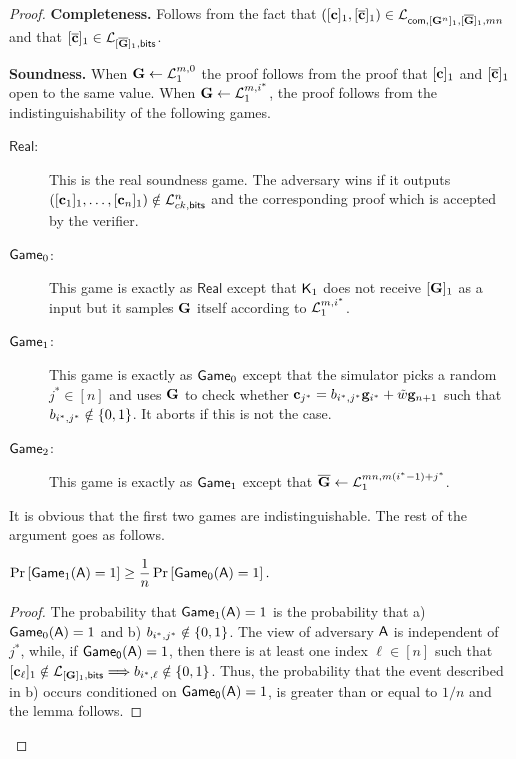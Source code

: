 \begin{proof}
{\bf Completeness.}
Follows from the fact that $([\mathbf{c}]_1,[\overline{\mathbf{c}}]_1)\in\mathcal{L}_{\mathsf{com},[\mathbf{{G}}^n]_1,[\overline{\mathbf{{G}}}]_1,mn}$ and that $[\overline{\mathbf{c}}]_1\in\mathcal{L}_{[\overline{\mathbf{{G}}}]_1,\mathsf{bits}}$.

{\bf Soundness.}
When $\mathbf{{G}}\gets\mathcal{L}_1^{m,0}$ the proof follows from the proof that $[\mathbf{c}]_1$ and $[{\overline{\mathbf{c}}}]_1$ open to the same value.
When $\mathbf{{G}}\gets\mathcal{L}_1^{m,i^*}$, the proof follows from the indistinguishability of the following games.

\begin{description}
\item[$\mathsf{Real}$:] This is the real soundness game. The adversary wins if it outputs $([\mathbf{c}_1]_1,\ldots,[\mathbf{c}_n]_1)\notin\mathcal{L}_{ck,\mathsf{bits}}^n$ and the corresponding proof which is accepted by the verifier.
\item[$\mathsf{Game}_0$:] This game is exactly as $\mathsf{Real}$ except that $\mathsf{K}_1$ does not receive $[\mathbf{{G}}]_1$ as a input but it samples $\mathbf{{G}}$ itself according to $\mathcal{L}_1^{m,i^*}$.
\item[$\mathsf{Game}_1$:] This game is exactly as $\mathsf{Game}_0$ except that the simulator picks a random $j^*\in[n]$ and uses $\mathbf{{G}}$ to check whether $\mathbf{c}_{j^*}=b_{i^*,j^*}\mathbf{g}_{i^*}+\tilde{w}\mathbf{g}_{n+1}$ such that $b_{i^*,j^*}\notin\{0,1\}$. It aborts if this is not the case.
\item[$\mathsf{Game}_2$:] This game is exactly as $\mathsf{Game}_1$ except that $\overline{\mathbf{{G}}}\gets\mathcal{L}_1^{mn, m(i^*-1)+j^*}$.
\end{description}

It is obvious that the first two games are indistinguishable. 
The rest of the argument goes as follows. 

\begin{lemma} $\Pr\left[ \mathsf{Game}_1(\mathsf{A})=1\right]\geq\dfrac{1}{n}\Pr\left[\mathsf{Game}_0(\mathsf{A})=1\right].$
\end{lemma}

\begin{proof}  The probability that
 $\mathsf{Game}_1(\mathsf{A})=1$ is the probability that  a) $\mathsf{Game}_0(\mathsf{A})=1$ and
b)  $b_{i^*,j^*} \notin \{0,1\}$. The view of adversary $\mathsf{A}$ is independent of $j^*$, while, if $\mathsf{Game_0}(\mathsf{A})=1$, then there is at least one index $\ell \in [n]$ such that $[\mathbf{c}_\ell]_1\notin\mathcal{L}_{[\mathbf{{G}}]_1,\mathsf{bits}}\Longrightarrow b_{i^*,\ell} \notin \{0,1\}$. Thus, 
the probability that the event described in b) occurs conditioned on $\mathsf{Game_0}(\mathsf{A})=1$, is greater than or equal to $1/n$ and the lemma follows.
\end{proof}


\end{proof}
